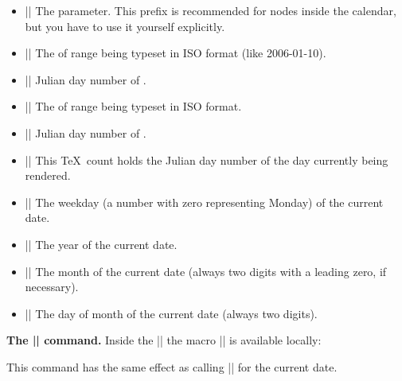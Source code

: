 \begin{command}{\pgfcalendar{}}
  \begin{itemize}
  \item |\pgfcalendarprefix|
    The  parameter. This prefix is recommended for nodes
    inside the calendar, but you have to use it yourself explicitly.
  \item |\pgfcalendarbeginiso|
    The  of range being typeset in ISO format (like 2006-01-10).
  \item |\pgfcalendarbeginjulian|
    Julian day number of .
  \item |\pgfcalendarendiso|
    The  of range being typeset in ISO format.
  \item |\pgfcalendarendjulian|
    Julian day number of .
  \item |\pgfcalendarcurrentjulian| This \TeX\ count holds the
    Julian day number of the day currently being rendered.
  \item |\pgfcalendarcurrentweekday| The weekday
    (a number with zero representing Monday) of the current date.
  \item |\pgfcalendarcurrentyear| The year of the current date.
  \item |\pgfcalendarcurrentmonth| The month of the current date
    (always two digits with a leading zero, if necessary).
  \item |\pgfcalendarcurrentday| The day of month of the current date
    (always two digits).
  \end{itemize}

  \medskip
  {\bfseries The |\ifdate| command.}
  Inside the |\pgfcalendar| the macro |\ifdate| is available
  locally:
  \begin{command}{\ifdate{}}
    \label{ifdate}%
    This command has the same effect as calling |\pgfcalendarifdate|
    for the current date.
  \end{command}


\end{command}
